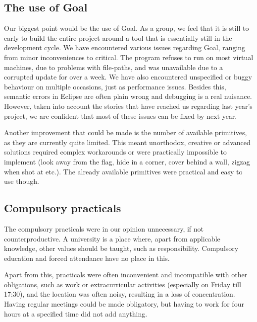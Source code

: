 \subsection{The use of Goal}
Our biggest point would be the use of Goal. As a group, we feel that it is still to early to build the entire project around a tool that is essentially still in the development cycle. We have encountered various issues regarding Goal, ranging from minor inconveniences to critical. The program refuses to run on most virtual machines, due to problems with file-paths, and was unavailable due to a corrupted update for over a week. We have also encountered unspecified or buggy behaviour on multiple occasions, just as performance issues. Besides this, semantic errors in Eclipse are often plain wrong and debugging is a real nuisance. However, taken into account the stories that have reached us regarding last year's project, we are confident that most of these issues can be fixed by next year.

Another improvement that could be made is the number of available primitives, as they are currently quite limited. This meant unorthodox, creative or advanced solutions required complex workarounds or were practically impossible to implement (look away from the flag, hide in a corner, cover behind a wall, zigzag when shot at etc.). The already available primitives were practical and easy to use though.

\subsection{Compulsory practicals}
The compulsory practicals were in our opinion unnecessary, if not counterproductive. A university is a place where, apart from applicable knowledge, other values should be taught, such as responsibility. Compulsory education and forced attendance have no place in this.

Apart from this, practicals were often inconvenient and incompatible with other obligations, such as work or extracurricular activities (especially on Friday till 17:30), and the location was often noisy, resulting in a loss of concentration. Having regular meetings could be made obligatory, but having to work for four hours at a specified time did not add anything. 





